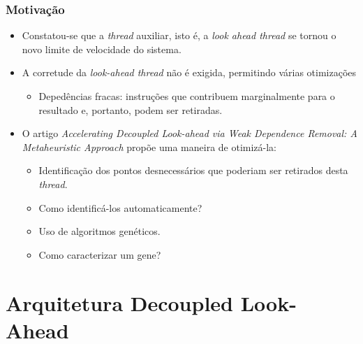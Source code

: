 \documentclass[10pt]{beamer}
\begin{document}
\begin{frame}
\frametitle{Motivação}

\begin{itemize}
\item Constatou-se que a \textit{thread} auxiliar, isto é, a \textit{look ahead
thread} se tornou o novo limite de velocidade do sistema.

\item A corretude da \textit{look-ahead thread} não é exigida, permitindo várias
otimizações

\begin{itemize} 
	\item Depedências fracas: instruções que contribuem marginalmente para o
	resultado e, portanto, podem ser retiradas.
	
\end{itemize} 

\item O artigo \textit{Accelerating Decoupled
Look-ahead via Weak Dependence Removal: A Metaheuristic Approach} propõe uma
maneira de otimizá-la:
 
\begin{itemize} 
	\item Identificação dos pontos desnecessários que poderiam ser retirados desta
	\textit{thread}. 
	
	\item Como identificá-los automaticamente?
	
	\item Uso de algoritmos genéticos.
  
  	\item Como caracterizar um gene? 
	
\end{itemize} 
\end{itemize}

\end{frame}

\section{Arquitetura Decoupled Look-Ahead}
\end{document}
